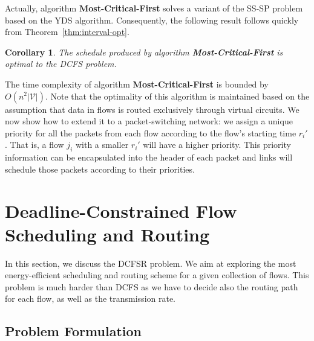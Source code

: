 \documentclass[10pt, conference, compsocconf]{IEEEtran}
\newtheorem{corollary}{Corollary}
\begin{document}
Actually, algorithm \textbf{Most-Critical-First} solves a variant of the SS-SP problem based on the YDS algorithm. Consequently, the following result follows quickly from Theorem~\ref{thm:interval-opt}.
\begin{corollary}
The schedule produced by algorithm \textbf{Most-Critical-First} is optimal to the DCFS problem.
\end{corollary}

The time complexity of algorithm \textbf{Most-Critical-First} is bounded by $O(n^2|\mathcal{V}|)$. Note that the optimality of this algorithm is maintained based on the assumption that data in flows is routed exclusively through virtual circuits. We now show how to extend it to a packet-switching network: we assign a unique priority for all the packets from each flow according to the flow's starting time $r_i'$. That is, a flow $j_i$ with a smaller $r_i'$ will have a higher priority. This priority information can be encapsulated into the header of each packet and links will schedule those packets according to their priorities. 

\section{Deadline-Constrained Flow Scheduling and Routing}
\label{sec:dtsr}

In this section, we discuss the DCFSR problem. We aim at exploring the most energy-efficient scheduling and routing scheme for a given collection of flows. This problem is much harder than DCFS as we have to decide also the routing path for each flow, as well as the transmission rate. 

\subsection{Problem Formulation}
\end{document}
